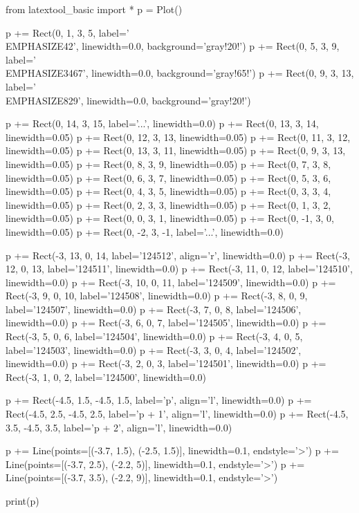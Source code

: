 \begin{python}
from latextool_basic import *
p = Plot()

p += Rect(0, 1, 3, 5, label='\\EMPHASIZE{42}', linewidth=0.0, background='gray!20!')
p += Rect(0, 5, 3, 9, label='\\EMPHASIZE{3467}', linewidth=0.0, background='gray!65!')
p += Rect(0, 9, 3, 13, label='\\EMPHASIZE{829}', linewidth=0.0, background='gray!20!')

p += Rect(0, 14, 3, 15, label='...', linewidth=0.0)
p += Rect(0, 13, 3, 14, linewidth=0.05)
p += Rect(0, 12, 3, 13, linewidth=0.05)
p += Rect(0, 11, 3, 12, linewidth=0.05)
p += Rect(0, 13, 3, 11, linewidth=0.05)
p += Rect(0, 9, 3, 13, linewidth=0.05)
p += Rect(0, 8, 3, 9, linewidth=0.05)
p += Rect(0, 7, 3, 8, linewidth=0.05)
p += Rect(0, 6, 3, 7, linewidth=0.05)
p += Rect(0, 5, 3, 6, linewidth=0.05)
p += Rect(0, 4, 3, 5, linewidth=0.05)
p += Rect(0, 3, 3, 4, linewidth=0.05)
p += Rect(0, 2, 3, 3, linewidth=0.05)
p += Rect(0, 1, 3, 2, linewidth=0.05)
p += Rect(0, 0, 3, 1, linewidth=0.05)
p += Rect(0, -1, 3, 0, linewidth=0.05)
p += Rect(0, -2, 3, -1, label='...', linewidth=0.0)

p += Rect(-3, 13, 0, 14, label='124512', align='r', linewidth=0.0)
p += Rect(-3, 12, 0, 13, label='124511', linewidth=0.0)
p += Rect(-3, 11, 0, 12, label='124510', linewidth=0.0)
p += Rect(-3, 10, 0, 11, label='124509', linewidth=0.0)
p += Rect(-3, 9, 0, 10, label='124508', linewidth=0.0)
p += Rect(-3, 8, 0, 9, label='124507', linewidth=0.0)
p += Rect(-3, 7, 0, 8, label='124506', linewidth=0.0)
p += Rect(-3, 6, 0, 7, label='124505', linewidth=0.0)
p += Rect(-3, 5, 0, 6, label='124504', linewidth=0.0)
p += Rect(-3, 4, 0, 5, label='124503', linewidth=0.0)
p += Rect(-3, 3, 0, 4, label='124502', linewidth=0.0)
p += Rect(-3, 2, 0, 3, label='124501', linewidth=0.0)
p += Rect(-3, 1, 0, 2, label='124500', linewidth=0.0)

p += Rect(-4.5, 1.5, -4.5, 1.5, label='p', align='l', linewidth=0.0)
p += Rect(-4.5, 2.5, -4.5, 2.5, label='p + 1', align='l', linewidth=0.0)
p += Rect(-4.5, 3.5, -4.5, 3.5, label='p + 2', align='l', linewidth=0.0)

p += Line(points=[(-3.7, 1.5), (-2.5, 1.5)], linewidth=0.1, endstyle='>')
p += Line(points=[(-3.7, 2.5), (-2.2, 5)], linewidth=0.1, endstyle='>')
p += Line(points=[(-3.7, 3.5), (-2.2, 9)], linewidth=0.1, endstyle='>')

print(p)
\end{python}

